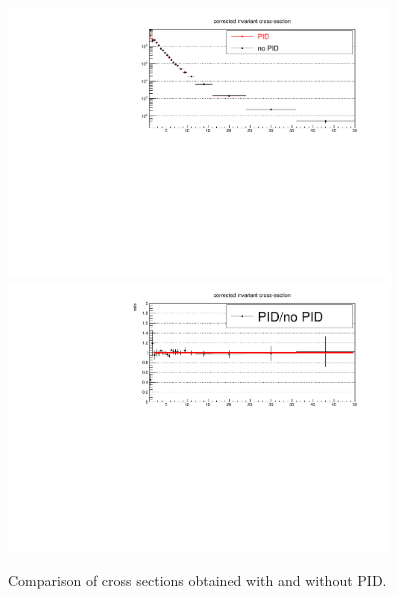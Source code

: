  
\begin{figure}[tb]
\begin{center} 
 \includegraphics[width=0.9\textwidth]{figures/Dstar/pp13TeV/cross-section-comaprison-PID-noPID.pdf}
 \includegraphics[width=0.9\textwidth]{figures/Dstar/pp13TeV/cross-section-ratio_PID_noPID-updated.pdf}
\caption{Comparison of \Dstar cross sections obtained with and without PID.}
\label{fig:PIDsyst2}
\end{center}
\end{figure}




